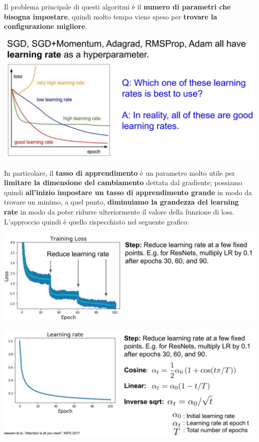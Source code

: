 \documentclass[12pt]{article}
\begin{document}
Il problema principale di questi algoritmi è il \textbf{numero di parametri che bisogna impostare}, quindi molto tempo viene speso per \textbf{trovare la configurazione migliore}.
\begin{center}
    \includegraphics[width =0.80\linewidth]{Images/173.PNG}
\end{center}
In particolare, il \textbf{tasso di apprendimento} è un parametro molto utile per \textbf{limitare la dimensione del cambiamento} dettata dal gradiente; possiamo quindi \textbf{all'inizio impostare un tasso di apprendimento grande} in modo da trovare un minimo, a quel punto, \textbf{diminuiamo la grandezza del learning rate} in modo da poter ridurre ulteriormente
il valore della funzione di loss. L'approccio quindi è quello rispecchiato nel seguente grafico:
\begin{center}
    \includegraphics[width =1\linewidth]{Images/174.PNG}
\end{center}
\begin{center}
    \includegraphics[width =1\linewidth]{Images/175.PNG}
\end{center}
\end{document}
